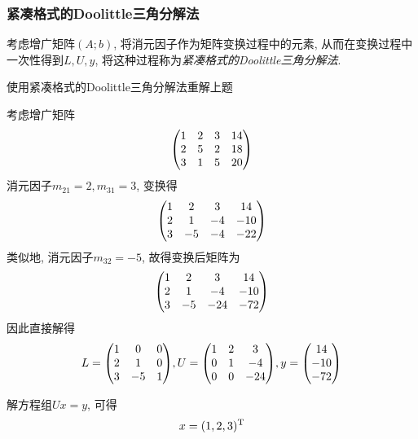 \subsubsection{紧凑格式的Doolittle三角分解法}

考虑增广矩阵$(A;b)$, 将消元因子作为矩阵变换过程中的元素, 从而在变换过程中一次性得到$L,U,y$, 将这种过程称为\emph{紧凑格式的Doolittle三角分解法}.

\begin{example}
    使用紧凑格式的Doolittle三角分解法重解上题
\end{example}

\begin{solution}
    考虑增广矩阵
    \begin{equation*}
        \mqty(
            1&2&3&14\\
            2&5&2&18\\
            3&1&5&20
        )
    \end{equation*}
    消元因子$m_{21}=2, m_{31}=3$, 变换得
    \begin{equation*}
        \mqty(
            1&2&3&14\\
            2&1&-4&-10\\
            3&-5&-4&-22
        )
    \end{equation*}
    类似地, 消元因子$m_{32}=-5$, 故得变换后矩阵为
    \begin{equation*}
        \mqty(
            1&2&3&14\\
            2&1&-4&-10\\
            3&-5&-24&-72
        )
    \end{equation*}
    因此直接解得
    \begin{equation*}
        L=\mqty(
            1&0&0\\
            2&1&0\\
            3&-5&1
        ), U=\mqty(
            1&2&3\\
            0&1&-4\\
            0&0&-24
        ), y=\mqty(14\\-10\\-72)
    \end{equation*}

    解方程组$Ux=y$, 可得
    \begin{equation*}
        x=(1,2,3)^\text{T}
    \end{equation*}
\end{solution}

